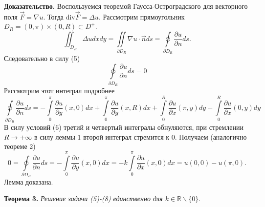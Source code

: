 \documentclass[12pt, a4paper]{article}
\begin{document}
	\textbf{Доказательство.}
	Воспользуемся теоремой Гаусса-Остроградского для векторного поля $\vec{F} = \nabla u$. Тогда $\mathrm{div} \vec{F} = \Delta u$. Рассмотрим прямоугольник $D_R = (0,\pi) \times (0, R) \subset D^+$. 
	\begin{equation*}
		\iint_{D_R} \Delta u dx dy = \iint\limits_{\partial D_R} \nabla u \cdot \vec{n} ds  = \oint\limits_{\partial D_R} \dfrac{\partial u}{\partial n} ds.
	\end{equation*}
	Следовательно в силу (5)
	\begin{equation*}
		\oint\limits_{\partial D_R} \dfrac{\partial u}{\partial n} ds = 0
	\end{equation*}
	Рассмотрим этот интеграл подробнее
	\begin{equation*}
			\oint\limits_{\partial D_R} \dfrac{\partial u}{\partial n} ds  =  -\int\limits_0^\pi \dfrac{\partial u}{\partial y}(x,0) dx  + \int\limits_0^\pi  \dfrac{\partial u}{\partial y}(x,R) dx  + \int\limits_0^R \dfrac{\partial u}{\partial x}(\pi, y) dy - \int\limits_0^R \dfrac{\partial u}{\partial x}(0, y) dy
	\end{equation*}
	В силу условий (6) третий и четвертый интегралы обнуляются, при стремлении $R \to + \infty$  в силу леммы 1 второй интеграл стремится к 0. Получаем (аналогично теореме 2)
	\begin{equation*}
		0 = \oint\limits_{\partial D_R} \dfrac{\partial u}{\partial n} ds = -\int\limits_0^\pi \dfrac{\partial u}{\partial y}(x,0) dx = - k \int\limits_0^\pi \dfrac{\partial u}{\partial x}(x,0)dx = u(0,0) - u(\pi, 0).
	\end{equation*}
	Лемма доказана.
	
	
		\textbf{Теорема 3.} \textit{Решение задачи (5)-(8) единственно для $k \in \mathbb{R}  \backslash \{0\}$}.
	
\end{document}
